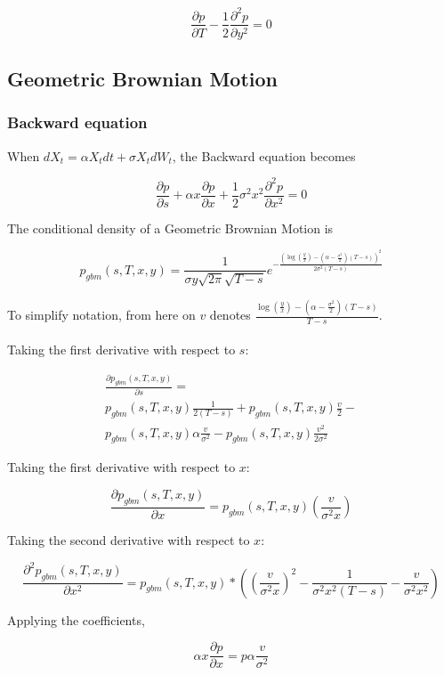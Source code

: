 \documentclass{article}
\theoremstyle{definition}
\begin{document}
\[\frac{\partial p} {\partial T} -\frac{1}{2} \frac{\partial^2 p}{\partial y^2} =0\]

\subsection{Geometric Brownian Motion}
\subsubsection{Backward equation}
When \(dX_t=\alpha X_t dt+\sigma X_t dW_t\), the Backward equation becomes

\[\frac{\partial p} {\partial s} +\alpha x \frac{\partial p}{\partial x} + \frac{1}{2} \sigma^2 x^2 \frac{\partial^2 p}{\partial x^2} =0\]

The conditional density of a Geometric Brownian Motion is

\[p_{gbm}(s, T, x, y)=\frac{1}{\sigma y\sqrt{2\pi} \sqrt{T-s} } e^{-\frac{\left( \log\left(\frac{y}{x}\right) -\left(\alpha-\frac{\sigma^2}{2}\right)(T-s)\right)^2}{2\sigma^2(T-s)}} \]

To simplify notation, from here on \(v\) denotes \(\frac{ \log\left(\frac{y}{x}\right) -\left(\alpha-\frac{\sigma^2}{2}\right)(T-s)}{T-s}\).
\\
\\
Taking the first derivative with respect to \(s\):


\begin{multline*}
\frac{\partial p_{gbm}(s, T, x, y)}{\partial s}  = \\ p_{gbm}(s, T, x, y) \frac{1}{2(T-s)} + p_{gbm}(s, T, x, y) \frac{v}{2}   - \\p_{gbm}(s, T, x, y) \alpha\frac{v}{\sigma^2}  -p_{gbm}(s, T, x, y)\frac{v^2}{2\sigma^2}  
\end{multline*}


Taking the first derivative with respect to \(x\):

\[\frac{\partial p_{gbm}(s, T, x, y)}{\partial x}=  p_{gbm}(s, T, x, y)\left(\frac{v }{\sigma^2 x}\right)  \]

Taking the second derivative with respect to \(x\):

\[\frac{\partial^2 p_{gbm}(s, T, x, y)}{\partial x^2}=  p_{gbm}(s, T, x, y)*\left(  \left(\frac{v }{\sigma^2 x}\right)^2 -\frac{1}{\sigma^2 x^2 (T-s)} - \frac{v }{\sigma^2 x^2}   \right)\]

Applying the coefficients,

\[\alpha x \frac{\partial p}{\partial x}=p \alpha \frac{v }{\sigma^2 }\]
\end{document}
